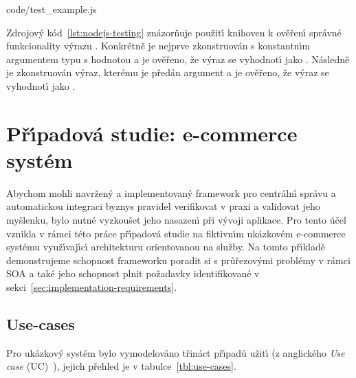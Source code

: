 
{code/test_example.js}

Zdrojov\'y kód~\ref{lst:nodejs-testing} znázorňuje použit\'{\i} knihoven k ověřen\'{\i} správné funkcionality v\'yrazu
. Konkrétně je nejprve zkonstruován s konstantn\'{\i}m argumentem typu 
s hodnotou  a je ověřeno, že v\'yraz se vyhodnot\'{\i} jako . Následně je zkonstruován
v\'yraz, kterému je předán argument  a je ověřeno, že v\'yraz se vyhodnot\'{\i} jako .

\section{Př\'{\i}padová studie: e-commerce systém}

Abychom mohli navržen\'y a implementovan\'y framework pro centráln\'{\i} správu
a automatickou integraci byznys pravidel verifikovat v praxi a validovat
jeho myšlenku, bylo nutné vyzkoušet jeho nasazen\'{\i} při v\'yvoji aplikace.
Pro tento účel vznikla v rámci této práce př\'{\i}padová studie na fiktivn\'{\i}m
ukázkovém e-commerce systému využ\'{\i}vaj\'{\i}c\'{\i} architekturu orientovanou na služby.
Na tomto př\'{\i}kladě demonstrujeme schopnost frameworku poradit si s průřezov\'ymi
problémy v rámci \gls{SOA} a také jeho schopnost plnit požadavky identifikované v
sekci~\ref{sec:implementation-requirements}.

\subsection{Use-cases}

Pro ukázkov\'y systém bylo vymodelováno třináct př\'{\i}padů užit\'{\i}
(z anglického \textit{Use case} (\gls{UC})~\cite{bittner2002use}), jejich
přehled je v tabulce~\ref{tbl:use-cases}.

